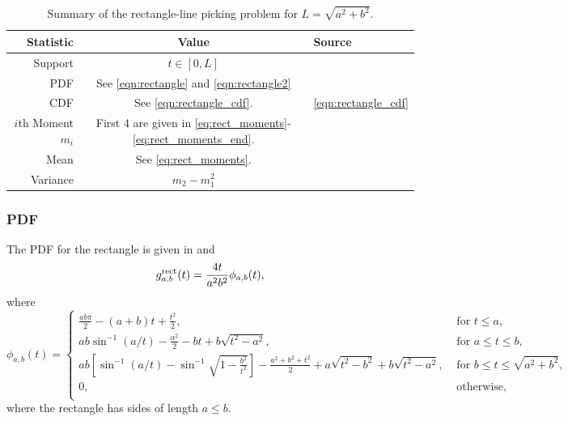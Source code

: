\begin{table}[ht]
  \centering
  \begin{tabular}{|r|c|l|}
    \hline
    Statistic & Value & Source \\ 
    \hline
      Support            & $t \in [0, L]$ & \\
      PDF                & See \eqref{eqn:rectangle} and \eqref{eqn:rectangle2}   &
                             \cite{b.ghosh51:_random_rect,mathai_geom} \\
      CDF                & See \eqref{eqn:rectangle_cdf}. & 
                           \eqref{eqn:rectangle_cdf} \\
      $i$th Moment $m_i$ & First 4 are given in
      \eqref{eq:rect_moments}-\eqref{eq:rect_moments_end}. 
                        & \cite{b.ghosh51:_random_rect} \\
      Mean               & See \eqref{eq:rect_moments}. &
                             \cite{} \\[1.5ex]
      Variance           & $\displaystyle m_2 - m_1^2$ &
                             \cite{} \\[1.5ex]
    \hline
  \end{tabular}
  \caption{Summary of the rectangle-line picking problem for $L=\sqrt{a^2+b^2}$.}
  \label{tab:summary_line}
\end{table}

\subsubsection{PDF}

The PDF for the rectangle is given in 
\cite[Theorem 2.4.4]{mathai_geom} and 
\cite[Theorem 2]{b.ghosh51:_random_rect}
\begin{equation}
  g^{\rm rect}_{a,b}(t) = \frac{4 t}{a^2 b^2} \phi_{a,b}(t),
  \label{eqn:rectangle}   
\end{equation}
where
\begin{equation}
  \phi_{a,b}(t) = \left\{
    \begin{array}{ll}
      \frac{ab \pi}{2} - (a+b) t + \frac{t^2}{2}, 
         & \mbox{ for } t \leq a, \\
      a b \sin^{-1} (a/t) - \frac{a^2}{2} - b t + b\sqrt{t^2 - a^2},
         & \mbox{ for } a \leq t \leq b, \\
      a b \left[ \sin^{-1} (a/t) - \sin^{-1} \sqrt{1 - \frac{b^2}{t^2}} \right]
        - \frac{a^2 + b^2 + t^2}{2} 
        + a\sqrt{t^2 - b^2}+ b\sqrt{t^2 - a^2},
         & \mbox{ for } b \leq t \leq \sqrt{a^2 + b^2}, \\
      0,
         & \mbox{ otherwise}, \\
    \end{array} \right. 
  \label{eqn:rectangle2}   
\end{equation}
where the rectangle has sides of length $a \leq b$.

